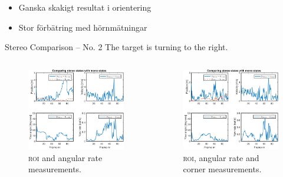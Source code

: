 \documentclass{beamer}
\newcommand{\roi}{\textsc{roi}\xspace}
\renewcommand{\aa}{\"a\xspace}
\renewcommand{\o}{\"o\xspace}
\begin{document}
\begin{frame}
	\note
	{
		\begin{itemize}
			\item Ganska skakigt resultat i orientering
			\item Stor f\o{}rb\aa{}tring med h\o{}rnm\aa{}tningar
		\end{itemize}
	}
\end{frame}

\begin{frame}{Stereo Comparison -- No. 2}
	The target is turning to the right.
	\begin{columns}[T]
	\begin{figure}
		\includegraphics[width=\textwidth]{Stereo/155733_RoiAngVel_gate_klt}
		\caption{\roi and angular rate measurements.}
	\end{figure}
	\begin{figure}
		\includegraphics[width=\textwidth]{Stereo/155733_AllMeasurements_gate_klt_perf}
		\caption{\roi, angular rate and corner measurements.}
	\end{figure}
	\end{columns}


\end{frame}
\end{document}
